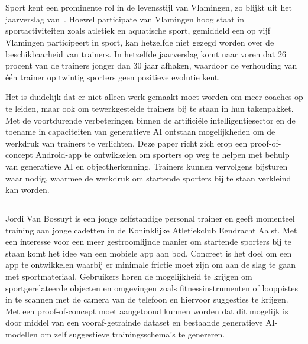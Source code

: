 

\chapter{}
\label{ch:inleiding}
Sport kent een prominente rol in de levensstijl van Vlamingen, zo blijkt uit het jaarverslag van~\autocite{SportVlaanderen2023}.
Hoewel participate van Vlamingen hoog staat in sportactiviteiten zoals atletiek en aquatische sport, gemiddeld een op vijf Vlamingen participeert in sport, kan hetzelfde niet gezegd worden over de beschikbaarheid van trainers.
In hetzelfde jaarverslag komt naar voren dat 26 procent van de trainers jonger dan 30 jaar afhaken, waardoor de verhouding van \'e\'en trainer op twintig sporters geen positieve evolutie kent.

Het is duidelijk dat er niet alleen werk gemaakt moet worden om meer coaches op te leiden, maar ook om tewerkgestelde trainers bij te staan in hun takenpakket.
Met de voortdurende verbeteringen binnen de artifici\"ele intelligentiesector en de toename in capaciteiten van generatieve AI ontstaan mogelijkheden om de werkdruk van trainers te verlichten.
Deze paper richt zich erop een proof-of-concept Android-app te ontwikkelen om sporters op weg te helpen met behulp van generatieve AI en objectherkenning.
Trainers kunnen vervolgens bijsturen waar nodig, waarmee de werkdruk om startende sporters bij te staan verkleind kan worden.

\section{}
\label{sec:probleemstelling}
Jordi Van Bossuyt is een jonge zelfstandige personal trainer en geeft momenteel training aan jonge cadetten in de Koninklijke Atletiekclub Eendracht Aalst.
Met een interesse voor een meer gestroomlijnde manier om startende sporters bij te staan komt het idee van een mobiele app aan bod.
Concreet is het doel om een app te ontwikkelen waarbij er minimale frictie moet zijn om aan de slag te gaan met sportmateriaal.
Gebruikers horen de mogelijkheid te krijgen om sportgerelateerde objecten en omgevingen zoals fitnessinstrumenten of looppistes in te scannen met de camera van de telefoon en hiervoor suggesties te krijgen.
Met een proof-of-concept moet aangetoond kunnen worden dat dit mogelijk is door middel van een vooraf-getrainde dataset en bestaande generatieve AI-modellen om zelf suggestieve trainingsschema's te genereren.

